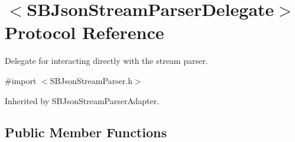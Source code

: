 \hypertarget{protocol_s_b_json_stream_parser_delegate-p}{
\section{$<$SBJsonStreamParserDelegate$>$ Protocol Reference}
\label{protocol_s_b_json_stream_parser_delegate-p}
}


Delegate for interacting directly with the stream parser.  




{\ttfamily \#import $<$SBJsonStreamParser.h$>$}



Inherited by SBJsonStreamParserAdapter.

\subsection*{Public Member Functions}
